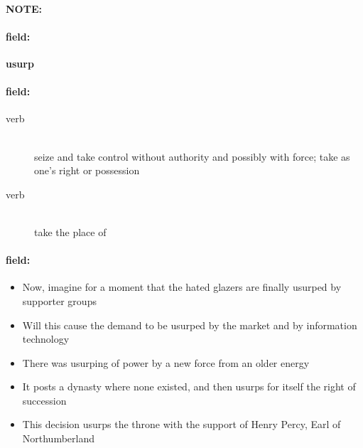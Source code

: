 \documentclass[12pt]{article}
\newenvironment{note}{\paragraph{NOTE:}}{}
\newenvironment{field}{\paragraph{field:}}{}
\begin{document}
\begin{note}
\begin{field}
\textbf{\large usurp}
\end{field}


\begin{field}
\begin{description}
\item[verb] \hfill \\ 
seize and take control without authority and possibly with force; take as one's right or possession

\item[verb] \hfill \\ 
take the place of

\end{description}
\end{field}

\begin{field}
\begin{itemize}
\item Now, imagine for a moment that the hated glazers are finally usurped by supporter groups
\item Will this cause the demand to be usurped by the market and by information technology
\item There was usurping of power by a new force from an older energy
\item It posts a dynasty where none existed, and then usurps for itself the right of succession
\item This decision usurps the throne with the support of Henry Percy, Earl of Northumberland
\end{itemize}
\end{field}
\end{note}
\end{document}
